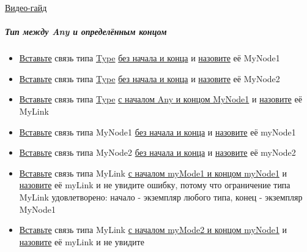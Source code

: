 \href{https://youtu.be/qKmDteKn3g8}{Видео-гайд}
\subparagraph{Тип между Any и определённым концом}
\begin{itemize}
      \item \hyperlink{DeepCase.InsertLink.Description}{Вставьте} связь типа
            \hyperlink{Core.Type.Description}{Type}
            \hyperlink{FAQ.HowToInsertLinkWithoutFromAndTo}{без
                  начала и конца} и \hyperlink{FAQ.HowToSetName}{назовите} её
            MyNode1
      \item \hyperlink{DeepCase.InsertLink.Description}{Вставьте} связь типа
            \hyperlink{Core.Type.Description}{Type}
            \hyperlink{FAQ.HowToInsertLinkWithoutFromAndTo}{без
                  начала и конца} и \hyperlink{FAQ.HowToSetName}{назовите} её
            MyNode2
      \item \hyperlink{DeepCase.InsertLink.Description}{Вставьте} связь типа
            \hyperlink{Core.Type.Description}{Type}
            \hyperlink{FAQ.HowToInsertLinkWithFromAndTo}{с
                  началом Any и концом MyNode1} и
            \hyperlink{FAQ.HowToSetName}{назовите} её
            MyLink
      \item \hyperlink{DeepCase.InsertLink.Description}{Вставьте} связь типа
            MyNode1
            \hyperlink{FAQ.HowToInsertLinkWithoutFromAndTo}{без начала и конца}
            и
            \hyperlink{FAQ.HowToSetName}{назовите} её myNode1
      \item \hyperlink{DeepCase.InsertLink.Description}{Вставьте} связь типа
            MyNode2
            \hyperlink{FAQ.HowToInsertLinkWithoutFromAndTo}{без начала и конца}
            и
            \hyperlink{FAQ.HowToSetName}{назовите} её myNode2
      \item \hyperlink{DeepCase.InsertLink.Description}{Вставьте} связь типа
            MyLink
            \hyperlink{FAQ.HowToInsertLinkWithFromAndTo}{с началом myMode1 и
                  концом
                  myNode1} и \hyperlink{FAQ.HowToSetName}{назовите} её myLink и
            не
            увидите
            ошибку, потому что ограничение типа MyLink удовлетворено: начало -
            экземпляр
            любого типа, конец - экземпляр MyNode1
      \item \hyperlink{DeepCase.InsertLink.Description}{Вставьте} связь типа
            MyLink
            \hyperlink{FAQ.HowToInsertLinkWithFromAndTo}{с началом myMode2 и
                  концом
                  myNode1} и \hyperlink{FAQ.HowToSetName}{назовите} её myLink и
            не
            увидите

\end{itemize}
